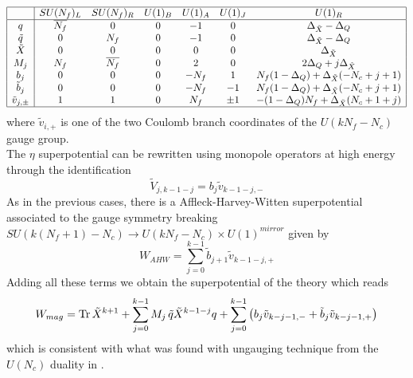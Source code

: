 \begin{equation}
\centering
\begin{array}{|c |c c c c c c |}
\hline
 & SU(N_f)_L & SU(N_f)_R & U(1)_B & U(1)_A & U(1)_J & U(1)_R  \\
\hline
q & \overline{N_f} & 0  & 
0 %
  & -1  & 0  & \Delta_{\tilde{X}} - \Delta_Q \\
\tilde{q}   & 0  &N_f &
 0 %
 & - 1  & 0 &\Delta_{\tilde{X}} - \Delta_Q \\
\tilde{X} & 0 & 0 & 0 & 0 &0 & \Delta_{\tilde{X}} \\
M_j  & N_f & \overline{N_f} & 0 & 2 & 0 & 2 \Delta_Q + j \Delta_{\tilde{X}}\\
b_j & 0  & 0 & 0  &   -N_f &  
1 %
   & N_f ( 1 - \Delta_Q) + \Delta_{\tilde{X}} (- N_c+ j +1  )  \\
 \tilde{b} _j & 0  & 0 & 0  &   - N_f &  
 -1%
   & N_f ( 1 - \Delta_Q) + \Delta_{\tilde{X}} (- N_c + j +1 )  \\
 \tilde{v}_{j,\pm} & 1 & 1 & 0 & N_f & \pm 1 & -(1 - \Delta_Q) N_f + \Delta_{\tilde{X}} (N_c+1 + j)\\
\hline
\end{array}
\end{equation}
where $\tilde{v}_{i,+}$ is one of the two Coulomb branch coordinates of the $U(k N_f - N_c)$ gauge group.\\
The $\eta$ superpotential can be rewritten using monopole operators at high energy through the identification \cite{Nii:2014jsa}
\begin{equation}
 \tilde{V}_{j, k-1-j} = b_{j} \tilde{v}_{k-1-j,-}
\end{equation}
As in the previous cases, there is a Affleck-Harvey-Witten superpotential
associated to the gauge symmetry breaking $SU(k (N_f +1) - N_c) \rightarrow U(k N_f - N_c) \times U(1)^{mirror}$ given by
\begin{equation}
W_{AHW} = \sum_{j=0}^{k-1} \tilde{b}_{j+1} \tilde{v}_{k-1-j,+}
\end{equation}
Adding all these terms we obtain the superpotential of the theory which reads
\begin{equation}
W_{mag} = \mathrm{Tr } \,{\tilde{X}^{k+1}} + \sum_{j=0}^{k-1} M_j \, \tilde{q} \tilde{X}^{k-1-j} q + \sum_{j=0}^{k-1} \left( b_{j} \tilde{v}_{k-j-1,-} + \tilde{b}_{j} \tilde{v}_{k-j-1,+}    \right) 
\end{equation}
which is consistent with what was found with ungauging technique from the $U(N_c)$ duality in \cite{Park:2013wta}.


































